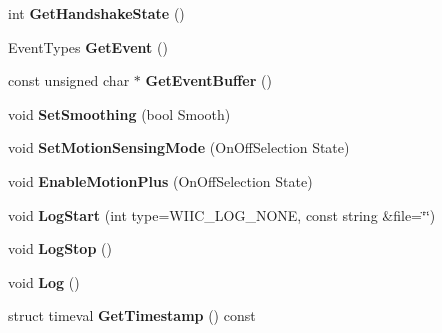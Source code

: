 \begin{DoxyCompactItemize}
\item 
\hypertarget{class_c_wiimote_a35a74550a3ec0115ccb39054da4b5064}{int {\bfseries \-Get\-Handshake\-State} ()}\label{class_c_wiimote_a35a74550a3ec0115ccb39054da4b5064}

\item 
\hypertarget{class_c_wiimote_a2f453ed8f5f825d0e503f6f0980d3c70}{\-Event\-Types {\bfseries \-Get\-Event} ()}\label{class_c_wiimote_a2f453ed8f5f825d0e503f6f0980d3c70}

\item 
\hypertarget{class_c_wiimote_a4ed15cfe1340119e090bd9c1feb86e17}{const unsigned char $\ast$ {\bfseries \-Get\-Event\-Buffer} ()}\label{class_c_wiimote_a4ed15cfe1340119e090bd9c1feb86e17}

\item 
\hypertarget{class_c_wiimote_a5f2218caddda3453cfdce8c27262a533}{void {\bfseries \-Set\-Smoothing} (bool \-Smooth)}\label{class_c_wiimote_a5f2218caddda3453cfdce8c27262a533}

\item 
\hypertarget{class_c_wiimote_a3c8c97c0b796d449e143a1a9147925bc}{void {\bfseries \-Set\-Motion\-Sensing\-Mode} (\-On\-Off\-Selection \-State)}\label{class_c_wiimote_a3c8c97c0b796d449e143a1a9147925bc}

\item 
\hypertarget{class_c_wiimote_ad3e4373c9ab443498f7f6b5cb9c73f20}{void {\bfseries \-Enable\-Motion\-Plus} (\-On\-Off\-Selection \-State)}\label{class_c_wiimote_ad3e4373c9ab443498f7f6b5cb9c73f20}

\item 
\hypertarget{class_c_wiimote_ab6d3946204a8836f800e4fd7a7643572}{void {\bfseries \-Log\-Start} (int type=\-W\-I\-I\-C\-\_\-\-L\-O\-G\-\_\-\-N\-O\-N\-E, const string \&file=\char`\"{}\char`\"{})}\label{class_c_wiimote_ab6d3946204a8836f800e4fd7a7643572}

\item 
\hypertarget{class_c_wiimote_ab4ca7dc470ba7da2ae2c321788ac12a6}{void {\bfseries \-Log\-Stop} ()}\label{class_c_wiimote_ab4ca7dc470ba7da2ae2c321788ac12a6}

\item 
\hypertarget{class_c_wiimote_ac07a724c6f0485927c666116d39e6dcc}{void {\bfseries \-Log} ()}\label{class_c_wiimote_ac07a724c6f0485927c666116d39e6dcc}

\item 
\hypertarget{class_c_wiimote_ac3f59a474bed928f29c7ea37a267a516}{struct timeval {\bfseries \-Get\-Timestamp} () const }\label{class_c_wiimote_ac3f59a474bed928f29c7ea37a267a516}


\end{DoxyCompactItemize}
